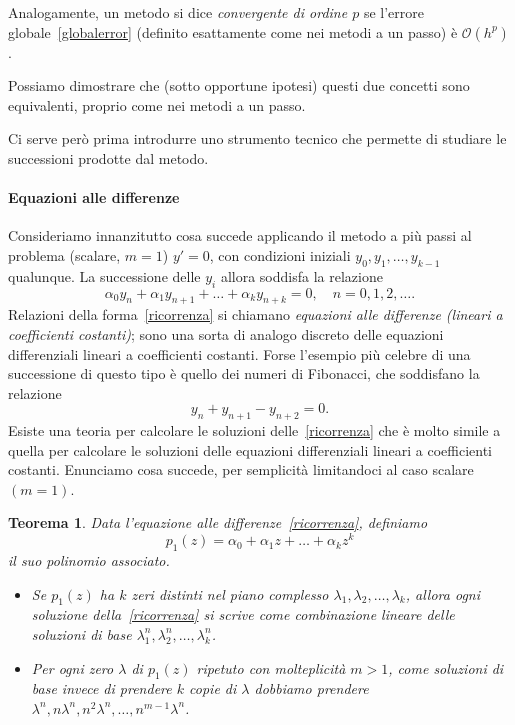 \documentclass[a4paper]{report}
\newtheorem{theorem}{Teorema}[chapter]
\theoremstyle{definiton}
\theoremstyle{remark}
\begin{document}
Analogamente, un metodo si dice \emph{convergente di ordine $p$} se l'errore globale~\eqref{globalerror} (definito esattamente come nei metodi a un passo) è $\mathcal{O}(h^p)$.

Possiamo dimostrare che (sotto opportune ipotesi) questi due concetti sono equivalenti, proprio come nei metodi a un passo.

Ci serve però prima introdurre uno strumento tecnico che permette di studiare le successioni prodotte dal metodo.


\paragraph{Equazioni alle differenze}

Consideriamo innanzitutto cosa succede applicando il metodo a più passi al problema (scalare, $m=1$) $y'=0$, con condizioni iniziali $y_0,y_1,\dots,y_{k-1}$ qualunque. La successione delle $y_i$ allora soddisfa la relazione
\begin{equation} \label{ricorrenza}
    \alpha_0 y_n + \alpha_1 y_{n+1} + \dots + \alpha_k y_{n+k} = 0, \quad n = 0,1,2,\dots.
\end{equation}
Relazioni della forma~\eqref{ricorrenza} si chiamano \emph{equazioni alle differenze (lineari a coefficienti costanti)}; sono una sorta di analogo discreto delle equazioni differenziali lineari a coefficienti costanti. Forse l'esempio più celebre di una successione di questo tipo è quello dei numeri di Fibonacci, che soddisfano la relazione
\[
y_n + y_{n+1} - y_{n+2} = 0.
\]
Esiste una teoria per calcolare le soluzioni delle~\eqref{ricorrenza} che è molto simile a quella per calcolare le soluzioni delle equazioni differenziali lineari a coefficienti costanti. Enunciamo cosa succede, per semplicità limitandoci al caso scalare $(m=1)$.

\begin{theorem}
Data l'equazione alle differenze~\eqref{ricorrenza}, definiamo
\[
p_1(z) = \alpha_0 + \alpha_1 z + \dots + \alpha_k z^k
\]
il suo polinomio associato. 
\begin{itemize}
    \item Se $p_1(z)$ ha $k$ zeri distinti nel piano complesso $\lambda_1, \lambda_2,\dots, \lambda_k$, allora ogni soluzione della~\eqref{ricorrenza} si scrive come combinazione lineare delle soluzioni di base $\lambda_1^n, \lambda_2^n, \dots, \lambda_k^n$.
    \item Per ogni zero $\lambda$ di $p_1(z)$ ripetuto con molteplicità $m>1$, come soluzioni di base invece di prendere $k$ copie di $\lambda$ dobbiamo prendere $\lambda^n, n\lambda^n, n^2\lambda^n,\dots, n^{m-1}\lambda^n$.
\end{itemize}
\end{theorem}
\end{document}
